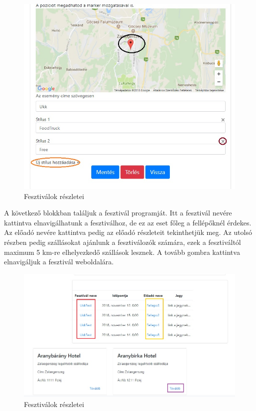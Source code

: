 \begin{figure}
\centering
\includegraphics[scale=0.64]{kepek/eventDet2.jpg}
\caption{Fesztiválok részletei}
\label{fig:event2Det}
\end{figure}
A következő blokkban találjuk a fesztivál programját. Itt a fesztivál nevére kattintva elnavigálhatunk a fesztiválhoz, de ez az eset főleg a fellépőknél érdekes. Az előadó nevére kattintva pedig az előadó részleteit tekinthetjük meg. Az utolsó részben pedig szállásokat ajánlunk a fesztiválozók számára, ezek a fesztiváltól maximum 5 km-re elhelyezkedő szállások lesznek. A tovább gombra kattintva elnavigáljuk a fesztivál weboldalára. 
\begin{figure}
\centering
\includegraphics[scale=0.64]{kepek/festFoot.jpg}
\caption{Fesztiválok részletei}
\label{fig:event3Det}
\end{figure}
